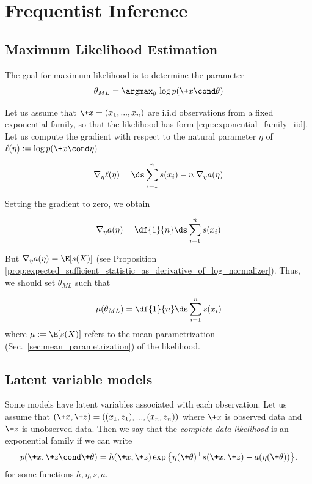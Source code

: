 \documentclass{article} %
\newcommand{\logNormalizerFunction}{a}
\newcommand{\sufficientStatsFunction}{s}
\newcommand{\carrierDensity}{h}
\newcommand{\meanParameter}{\mu}
\begin{document}
\section{Frequentist Inference}

\subsection{Maximum Likelihood Estimation}
\label{sec:ml_with_ef}


The goal for maximum likelihood is to determine the parameter
\begin{equation}
\label{eqn:ml}
\theta_{ML} = \argmax_\theta  \, \log p(\+x \cond \theta) 
\end{equation}

Let us assume that $\+x=(x_1, ..., x_n)$ are i.i.d observations  from a fixed exponential family, so that the likelihood has form \eqref{eqn:exponential_family_iid}.  Let us compute the gradient with respect to the natural parameter $\eta$ of $\ell(\eta) := \log p(\+x \cond \eta)$

\[ \nabla_\eta \ell(\eta) = \ds\sum_{i=1}^n \sufficientStatsFunction(x_i) - n \; \nabla_\eta \logNormalizerFunction(\eta) \]

Setting the gradient to zero, we obtain

\[ \nabla_\eta \logNormalizerFunction(\eta) = \df{1}{n}  \ds\sum_{i=1}^n \sufficientStatsFunction(x_i) \]

But $\nabla_\eta \logNormalizerFunction(\eta) = \E [\sufficientStatsFunction(X)]$  (see Proposition \ref{prop:expected_sufficient_statistic_as_derivative_of_log_normalizer}).  Thus, we should set $\theta_{ML}$ such that
%

\begin{align}
\meanParameter(\theta_{ML}) = \df{1}{n} \ds\sum_{i=1}^n \sufficientStatsFunction(x_i) 	
 \label{eqn:maximum_likelihood_solution_for_exponential_families}
\end{align}
%
where $\meanParameter:= \E[\sufficientStatsFunction(X)]$ refers to the mean parametrization (Sec.~\ref{sec:mean_parametrization}) of the likelihood.  

\subsection{Latent variable models}

Some models have latent variables associated with each observation.   Let us  assume that $(\+x, \+z)=((x_1,z_1), ..., (x_n, z_n))$ where $\+x$ is observed data and $\+z$ is unobserved data.   Then we say that the \textit{complete data likelihood} is an exponential family if we can write
%
\begin{align}
 p(\+x, \+z \cond \+\theta) = \carrierDensity(\+x, \+z) \exp \big\{ \eta(\+\theta)^\top \sufficientStatsFunction(\+x, \+z) - \logNormalizerFunction(\eta(\+\theta))\big\}. 
\label{eqn:exponential_family_complete_data_likelihood}
 \end{align}
%
for some functions $\carrierDensity, \eta, \sufficientStatsFunction, \logNormalizerFunction$. 
\end{document}
